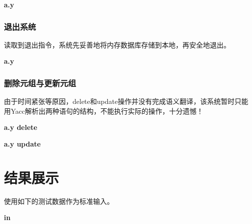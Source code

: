 \documentclass{article}
\begin{document}
\begin{spacing}{2}
            \textbf{a.y}
            \begin{spacing}{1.15}
            
            \end{spacing}
        \subsubsection{退出系统}
            读取到退出指令，系统先妥善地将内存数据库存储到本地，再安全地退出。

            \textbf{a.y}
            \begin{spacing}{1.15}
            
            \end{spacing}


        \subsubsection{删除元组与更新元组}
            由于时间紧张等原因，delete和update操作并没有完成语义翻译，该系统暂时只能用Yacc解析出两种语句的结构，不能执行实际的操作，十分遗憾！

            \textbf{a.y delete}
            \begin{spacing}{1.15}
            
            \end{spacing}

            \textbf{a.y update}
            \begin{spacing}{1.15}
            
            \end{spacing}
    
\section{结果展示}
    使用如下的测试数据作为标准输入。

    \textbf{in}
    \begin{spacing}{1.15}
    
    \end{spacing}
    
    \ 


\end{spacing}
\end{document}
